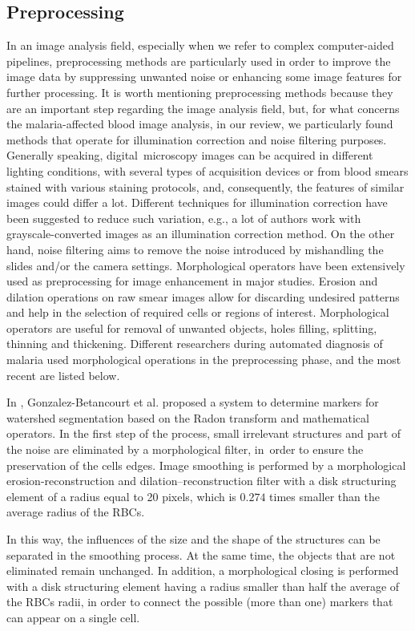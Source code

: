 \documentclass[sensors,review,accept,moreauthors,pdftex,10pt,a4paper]{mdpi}
\begin{document}
\subsection{Preprocessing}
In an image analysis field, especially when we refer to complex computer-aided pipelines, preprocessing methods are particularly used in order to improve the image data by suppressing unwanted noise or enhancing some image features for further processing.
It is worth mentioning preprocessing methods because they are an important step regarding the image analysis field, but, for what concerns the malaria-affected blood image analysis, in our review, we particularly found methods that operate for illumination correction and noise filtering purposes.
Generally speaking, digital~microscopy images can be acquired in different lighting conditions, with several types of acquisition devices or from blood smears stained with various staining protocols, and, consequently, the features of similar images could differ a lot.
Different techniques for illumination correction have been suggested to reduce such variation, e.g., a lot of authors work with grayscale-converted images as an illumination correction method.
On the other hand, noise filtering aims to remove the noise introduced by mishandling the slides and/or the camera settings.
Morphological operators have been extensively used as preprocessing for image enhancement in major studies.
Erosion and dilation operations on raw smear images allow for discarding undesired patterns and help in the selection of required cells or regions of interest. Morphological operators are useful for removal of unwanted
objects, holes filling, splitting, thinning and thickening. Different researchers during automated diagnosis of malaria used morphological operations in the preprocessing phase, and the most recent are listed below.

In \cite{Gonzalez2016}, Gonzalez-Betancourt et al. proposed a system to determine markers for watershed segmentation based on the Radon transform and mathematical operators. In the first step of the process, small irrelevant structures and part of the noise are eliminated by a morphological filter, in~order to ensure the preservation of the cells edges. Image smoothing is performed by a morphological erosion-reconstruction and dilation--reconstruction filter with a disk structuring element of a radius equal to 20 pixels, which is $0.274$ times smaller than the average radius of the RBCs. 

In this way, the influences of the size and the shape of the structures can be separated in the smoothing process. At the same time, the objects that are not eliminated remain unchanged. In addition, a morphological closing is performed with a disk structuring element having a radius smaller than half the average of the RBCs radii, in order to connect the possible (more than one) markers that can appear on a single cell.
\end{document}
